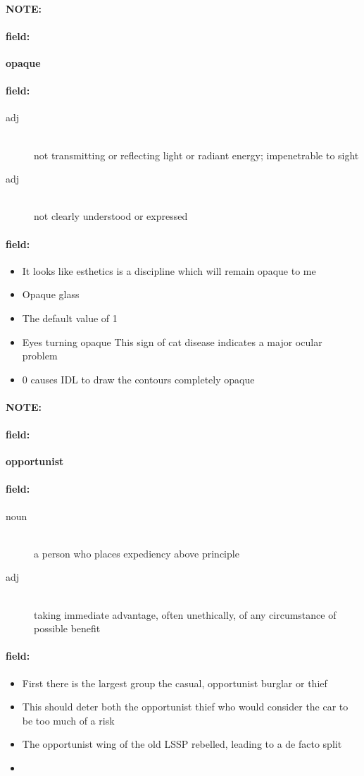 \documentclass[12pt]{article}
\newenvironment{note}{\paragraph{NOTE:}}{}
\newenvironment{field}{\paragraph{field:}}{}
\begin{document}
\begin{note}
\begin{field}
\textbf{\large opaque}
\end{field}


\begin{field}
\begin{description}
\item[adj] \hfill \\ 
not transmitting or reflecting light or radiant energy; impenetrable to sight

\item[adj] \hfill \\ 
not clearly understood or expressed

\end{description}
\end{field}

\begin{field}
\begin{itemize}
\item It looks like esthetics is a discipline which will remain opaque to me
\item Opaque glass
\item The default value of 1
\item Eyes turning opaque This sign of cat disease indicates a major ocular problem
\item 0 causes IDL to draw the contours completely opaque
\end{itemize}
\end{field}
\end{note}
\begin{note}
\begin{field}
\textbf{\large opportunist}
\end{field}


\begin{field}
\begin{description}
\item[noun] \hfill \\ 
a person who places expediency above principle

\item[adj] \hfill \\ 
taking immediate advantage, often unethically, of any circumstance of possible benefit

\end{description}
\end{field}

\begin{field}
\begin{itemize}
\item First there is the largest group  the casual, opportunist burglar or thief
\item This should deter both the opportunist thief who would consider the car to be too much of a risk
\item The opportunist wing of the old LSSP rebelled, leading to a de facto split
\item 
\end{itemize}
\end{field}
\end{note}
\end{document}
